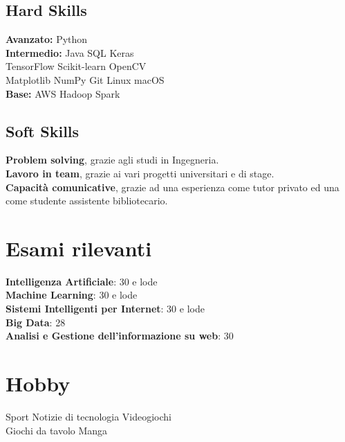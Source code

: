 \documentclass[]{deedy-resume-openfont}
\begin{document}
\begin{minipage}[t]{0.33\textwidth}
\subsection{Hard Skills}
\textbf{Avanzato:} Python \\
\textbf{Intermedio:} Java \textbullet{} SQL \textbullet{} Keras \\
TensorFlow \textbullet{} Scikit-learn \textbullet{} OpenCV \\
Matplotlib \textbullet{} NumPy \textbullet{} Git \textbullet{} Linux \textbullet{} macOS \\
\textbf{Base:} AWS \textbullet{} Hadoop \textbullet{} Spark
\sectionsep

\subsection{Soft Skills}
\textbf{Problem solving}, grazie agli studi in Ingegneria. \\
\textbf{Lavoro in team}, grazie ai vari progetti universitari e di stage. \\
\textbf{Capacità comunicative}, grazie ad una esperienza come tutor privato ed una come studente assistente bibliotecario.
\sectionsep


\section{Esami rilevanti}
\textbf{Intelligenza Artificiale}: 30 e lode \\
\textbf{Machine Learning}: 30 e lode \\
\textbf{Sistemi Intelligenti per Internet}: 30 e lode \\
\textbf{Big Data}: 28 \\
\textbf{Analisi e Gestione dell'informazione su web}: 30
\sectionsep


\section{Hobby}
Sport \textbullet{} Notizie di tecnologia \textbullet{} Videogiochi \\
Giochi da tavolo \textbullet{} Manga

%
%

\end{minipage}
\end{document}
